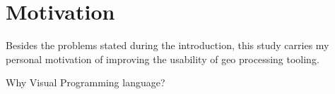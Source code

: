 \section{Motivation}

Besides the problems stated during the introduction, this study carries my personal motivation of improving the usability of geo processing tooling. 

Why Visual Programming language?

















